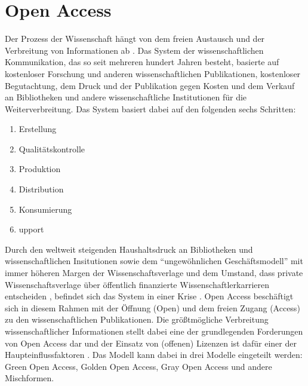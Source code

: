 \section{Open Access} 
Der Prozess der Wissenschaft hängt von dem freien Austausch und der Verbreitung von Informationen ab . Das System der wissenschaftlichen Kommunikation, das so seit mehreren hundert Jahren besteht, basierte auf kostenloser Forschung und anderen wissenschaftlichen Publikationen, kostenloser Begutachtung, dem Druck und der Publikation gegen Kosten und dem Verkauf an Bibliotheken und andere wissenschaftliche Institutionen für die Weiterverbreitung. Das System basiert dabei auf den folgenden sechs Schritten:
\begin{enumerate}
\item Erstellung
\item Qualitätskontrolle
\item Produktion
\item Distribution
\item Konsumierung
\item upport
\end{enumerate}
Durch den weltweit steigenden Haushaltsdruck an Bibliotheken und wissenschaftlichen Insitutionen sowie dem “ungewöhnlichen Geschäftsmodell”  mit immer höheren Margen der Wissenschaftsverlage und dem Umstand, dass private Wissenschaftsverlage über öffentlich finanzierte Wissenschaftlerkarrieren entscheiden , befindet sich das System in einer Krise . Open Access beschäftigt sich in diesem Rahmen mit der Öffnung (Open) und dem freien Zugang (Access) zu den wissenschaftlichen Publikationen. Die größtmögliche Verbreitung wissenschaftlicher Informationen stellt dabei eine der grundlegenden Forderungen von Open Access dar  und der Einsatz von (offenen) Lizenzen ist dafür einer der Haupteinflussfaktoren . Das Modell kann dabei in drei Modelle eingeteilt werden: Green Open Access, Golden Open Access, Gray Open Access und andere Mischformen.
